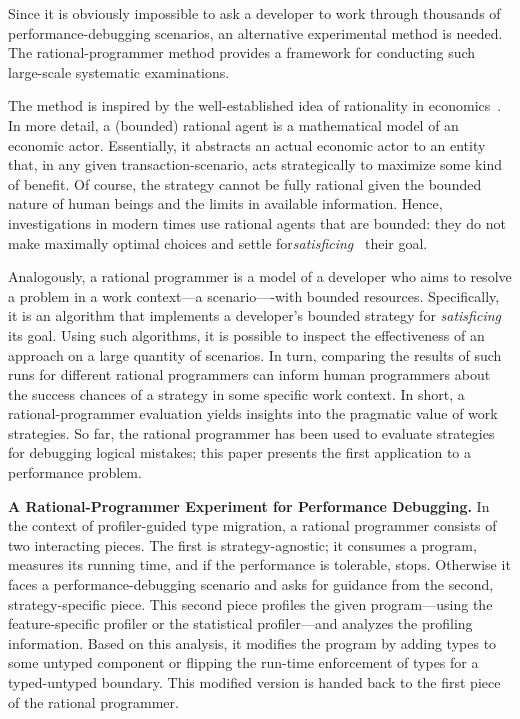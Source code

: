 Since it is obviously impossible to ask a developer to work through thousands of
performance-debugging scenarios, an alternative experimental method is needed.
The rational-programmer method provides a framework for conducting such
large-scale systematic examinations.

The method is inspired by the well-established idea of rationality in
economics~\cite{mill1874essays, henrich2001search}.  In more detail, a (bounded)
rational agent is a mathematical model of an economic actor. Essentially, it
abstracts an actual economic actor to an entity that, in any given
transaction-scenario, acts strategically to maximize some kind of benefit.  Of
course, the strategy cannot be fully rational given the bounded nature of human
beings and the limits in available information. Hence, investigations in modern
times use rational agents that are bounded: they do not make maximally optimal
choices and settle for\emph{satisficing}~\cite{hs:satisfice} their goal.

Analogously, a rational programmer is a model of a developer who aims to resolve
a problem in a work context---a scenario----with bounded
resources. Specifically, it is an algorithm that implements a developer's
bounded strategy for \emph{satisficing} its goal. Using such algorithms, it is
possible to inspect the effectiveness of an approach on a large quantity of
scenarios. In turn, comparing the results of such runs for different rational
programmers can inform human programmers about the success chances of a strategy
in some specific work context. In short, a rational-programmer evaluation yields
insights into the pragmatic value of work strategies. So far, the rational
programmer has been used to evaluate strategies for debugging logical mistakes;
this paper presents the first application to a performance problem. 

\medskip

\noindent\textbf{A Rational-Programmer Experiment for Performance Debugging.}
In the context of profiler-guided type migration, a rational programmer consists
of two interacting pieces.  The first is strategy-agnostic; it consumes a
program, measures its running time, and if the performance is tolerable,
stops. Otherwise it faces a performance-debugging scenario and asks for guidance
from the second, strategy-specific piece. This second piece profiles the given
program---using the feature-specific profiler or the statistical profiler---and
analyzes the profiling information. Based on this analysis, it modifies the
program by adding types to some untyped component or flipping the run-time
enforcement of types for a typed-untyped boundary. This modified version is
handed back to the first piece of the rational programmer.

